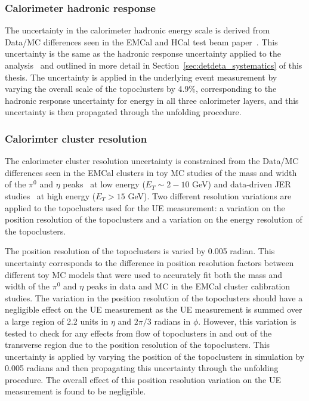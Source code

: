 \subsubsection{Calorimeter hadronic response}
The uncertainty in the calorimeter hadronic energy scale is derived from Data/MC differences seen in the EMCal and HCal test beam paper~\cite{emcal_beamtest,emcal_hcal_beamtest}.
This uncertainty is the same as the hadronic response uncertainty applied to the \detdeta analysis~\cite{sphenix_detdeta} and outlined in more detail in Section~\ref{sec:detdeta_systematics} of this thesis.
The uncertainty is applied in the underlying event measurement by varying the overall scale of the topoclusters by 4.9\%, corresponding to the hadronic response uncertainty for energy in all three calorimeter layers, and this uncertainty is then propagated through the unfolding procedure.

\subsubsection{Calorimter cluster resolution}
The calorimeter cluster resolution uncertainty is constrained from the Data/MC differences seen in the EMCal clusters in toy MC studies of the mass and width of the $\pi^{0}$ and $\eta$ peaks~\cite{jaeboem_emcal_calib} at low energy ($E_{T} \sim 2-10$ GeV) and data-driven JER studies~\cite{ppg08AN} at high energy ($E_{T} > 15$ GeV).
Two different resolution variations are applied to the topoclusters used for the UE measurement: a variation on the position resolution of the topoclusters and a variation on the energy resolution of the topoclusters.

The position resolution of the topoclusters is varied by 0.005 radian. This uncertainty corresponds to the difference in position resolution factors between different toy MC models that were used to accurately fit both the mass and width of the $\pi^{0}$ and $\eta$ peaks in data and MC in the EMCal cluster calibration studies.
The variation in the position resolution of the topoclusters should have a negligible effect on the UE measurement as the UE measurement is summed over a large region of 2.2 units in $\eta$ and $2 \pi/ 3$ radians in $\phi$.
However, this variation is tested to check for any effects from flow of topoclusters in and out of the transverse region due to the position resolution of the topoclusters.
This uncertainty is applied by varying the position of the topoclusters in simulation by 0.005 radians and then propagating this uncertainty through the unfolding procedure.
The overall effect of this position resolution variation on the UE measurement is found to be negligible.

